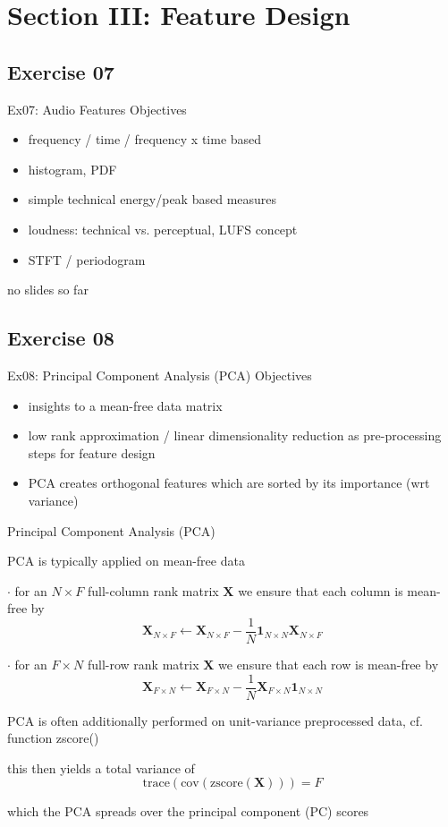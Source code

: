 \documentclass[mathserif, aspectratio=1610]{intbeamer}
\begin{document}
\section{Section III: Feature Design}

\subsection{Exercise 07}
\begin{frame}{Ex07: Audio Features}
Objectives
\begin{itemize}
\item frequency / time / frequency x time based
\item histogram, PDF
\item simple technical energy/peak based measures
\item loudness: technical vs. perceptual, LUFS concept
\item STFT / periodogram
\end{itemize}

no slides so far

\end{frame}




\subsection{Exercise 08}

\begin{frame}{Ex08: Principal Component Analysis (PCA)}
Objectives
\begin{itemize}
\item insights to a mean-free data matrix
\item low rank approximation / linear dimensionality reduction as pre-processing steps for feature design
\item PCA creates orthogonal features which are sorted by its importance (wrt variance)
\end{itemize}
\end{frame}


\begin{frame}[t]{Principal Component Analysis (PCA)}

PCA is typically applied on mean-free data

$\cdot$ for an $N \times F$ full-column rank matrix $\bm{X}$ we ensure that each column is mean-free by
$$\bm{X}_{N \times F} \leftarrow \bm{X}_{N \times F} - \frac{1}{N} \bm{1}_{N \times N} \bm{X}_{N \times F}$$

$\cdot$ for an $F \times N$ full-row rank matrix $\bm{X}$ we ensure that each row is mean-free by
$$\bm{X}_{F \times N} \leftarrow \bm{X}_{F \times N} - \frac{1}{N} \bm{X}_{F \times N} \bm{1}_{N \times N}$$

PCA is often additionally performed on unit-variance preprocessed data, cf. function zscore()

this then yields a total variance of $$\mathrm{trace}(\mathrm{cov}(\mathrm{zscore}(\bm{X})))= F$$

which the PCA spreads over the principal component (PC) scores

\end{frame}
\end{document}
